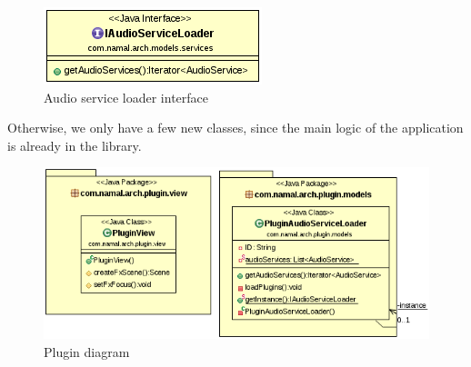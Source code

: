 \documentclass{report}
\begin{document}
{\begin{center}
\begin{figure}[H]
  \includegraphics[scale=0.4]{class/AudioServiceLoader.png}
  \caption{Audio service loader interface}
  \label{AudioServiceLoader}
\end{figure}
\end{center}

Otherwise, we only have a few new classes, since the main logic of the application is already in the library. 

\begin{center}
\begin{figure}[H]

  \includegraphics[scale=0.4]{class/Plugin.png}
  \caption{Plugin diagram}
  \label{Plugin}
\end{figure}
\end{center}
}
\end{document}
